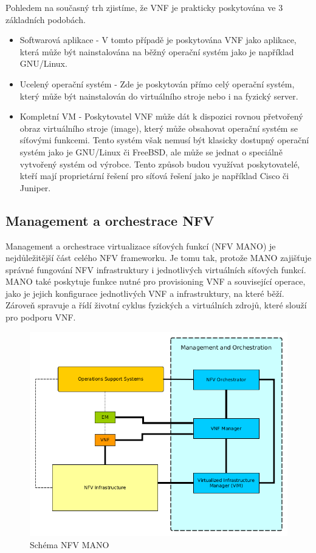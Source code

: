 Pohledem na současný trh zjistíme, že VNF je prakticky poskytována ve 3 základních podobách.

\begin{itemize}
\item Softwarová aplikace - V tomto případě je poskytována VNF jako aplikace, která může být nainstalována na běžný operační systém jako je například GNU/Linux.
\item Ucelený operační systém - Zde je poskytován přímo celý operační systém, který může být nainstalován do virtuálního stroje nebo i na fyzický server.
\item Kompletní VM - Poskytovatel VNF může dát k dispozici rovnou přetvořený obraz virtuálního stroje (image), který může obsahovat operační systém se síťovými funkcemi. Tento systém však nemusí být klasicky dostupný operační systém jako je GNU/Linux či FreeBSD, ale může se jednat o speciálně vytvořený systém od výrobce. Tento způsob budou využívat poskytovatelé, kteří mají proprietární řešení pro síťová řešení jako je například Cisco či Juniper.
\end{itemize}

\subsection{Management a orchestrace NFV}

Management a orchestrace virtualizace síťových funkcí (NFV MANO) je nejdůležitější část celého NFV frameworku. Je tomu tak, protože MANO zajišťuje správné fungování NFV infrastruktury i jednotlivých virtuálních síťových funkcí. MANO také poskytuje funkce nutné pro provisioning VNF a související operace, jako je jejich konfigurace jednotlivých VNF a infrastruktury, na které běží. Zároveň spravuje a řídí životní cyklus fyzických a virtuálních zdrojů, které slouží pro podporu VNF. 

\begin{figure}[h]
\begin{centering}
\includegraphics[scale=0.65]{images/MANO}
\par\end{centering}
\caption{Schéma NFV MANO\label{fig:MANO}}
\end{figure}

